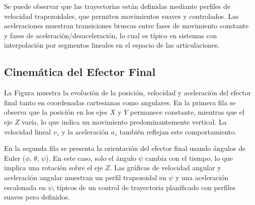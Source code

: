 Se puede observar que las trayectorias están definidas mediante perfiles de velocidad trapezoidales, que permiten movimientos suaves y controlados. Las aceleraciones muestran transiciones bruscas entre fases de movimiento constante y fases de aceleración/desaceleración, lo cual es típico en sistemas con interpolación por segmentos lineales en el espacio de las articulaciones.


\subsection{Cinemática del Efector Final}
La Figura muestra la evolución de la posición, velocidad y aceleración del efector final tanto en coordenadas cartesianas como angulares. En la primera fila se observa que la posición en los ejes $X$ y $Y$ permanece constante, mientras que el eje $Z$ varía, lo que indica un movimiento predominantemente vertical. La velocidad lineal $v_z$ y la aceleración $a_z$ también reflejan este comportamiento.

En la segunda fila se presenta la orientación del efector final usando ángulos de Euler ($\phi$, $\theta$, $\psi$). En este caso, solo el ángulo $\psi$ cambia con el tiempo, lo que implica una rotación sobre el eje $Z$. Las gráficas de velocidad angular y aceleración angular muestran un perfil trapezoidal en $\dot{\psi}$ y una aceleración escalonada en $\ddot{\psi}$, típicos de un control de trayectoria planificado con perfiles suaves pero definidos.


